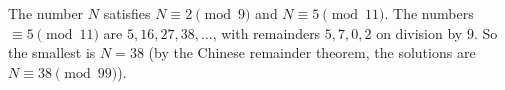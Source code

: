 The number $N$ satisfies $N\equiv2\pmod9$ and $N\equiv5\pmod{11}$. The numbers $\equiv5\pmod{11}$ are $5,16,27,38,\dots$, with remainders $5,7,0,2$ on division by $9$. So the smallest is $N=\boxed{38}$ (by the Chinese remainder theorem, the solutions are $N\equiv38\pmod{99}$).
